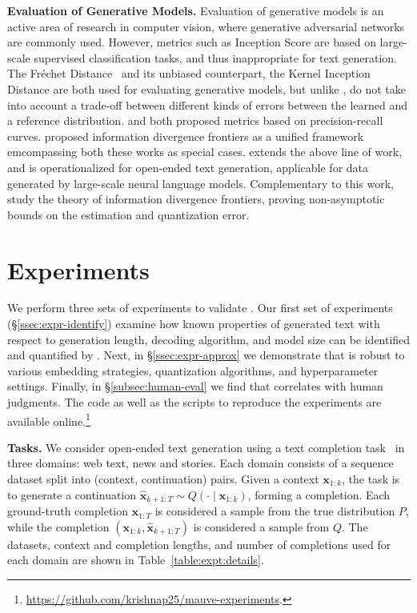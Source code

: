 \documentclass{article}
\newcommand{\myparagraph}[1]{\par\noindent\textbf{{#1}.}} %
\newcommand \xv {\bm{x}}
\theoremstyle{definition}
\newcommand{\name}{{\fontfamily{bch}\selectfont{\textsc{Mauve}}}\xspace}
\begin{document}
\myparagraph{Evaluation of Generative Models}
Evaluation of generative models is an active area of research in computer vision, where generative adversarial networks \cite{goodfellow2014generative} are commonly used.
However, metrics such as Inception Score \cite{salimans2016improved} are based on large-scale supervised classification tasks, and thus inappropriate for text generation.
%
The Fr\'{e}chet Distance~\cite{heusel2017gans,semeniuta2018accurate} and its unbiased counterpart, the Kernel Inception Distance \cite{bikowski2018demystifying} are both used for evaluating generative models, but unlike \name, do not take into account a trade-off between different kinds of errors between the learned and a reference distribution.
\citet{sajjadi2018assessing} and \citet{kynknniemi2019improved} both proposed metrics based on precision-recall curves.
\citet{djolonga2020precision} proposed information divergence frontiers as a unified framework emcompassing both these works as special cases. 
\name extends the above line of work, and is operationalized for open-ended text generation, applicable for data generated by large-scale neural language models. 
Complementary to this work, \citet{liu2021divergence} study the theory of information divergence frontiers, proving non-asymptotic bounds on the estimation and quantization error.


%


%
%
\section{Experiments}
\label{sec:experiments}
%


We perform three sets of experiments to validate \name.
%
Our first set of experiments (\S\ref{ssec:expr-identify}) examine how known properties of generated text with respect to generation length, decoding algorithm,  and model size can be identified and quantified by \name.
Next, in \S\ref{ssec:expr-approx} we demonstrate that \name is robust to various embedding strategies, quantization algorithms, and hyperparameter settings.
Finally, in \S\ref{subsec:human-eval} we find that \name correlates with human judgments.
The code as well as the scripts to reproduce the experiments are available online.\footnote{
        \url{https://github.com/krishnap25/mauve-experiments}.
}
%
%
%
%
%


\myparagraph{Tasks}
We consider open-ended text generation using a text completion task~\citep{holtzman2019curious,welleck2020neural} in three domains: web text, news and stories.
Each domain consists of a sequence dataset split into (context, continuation) pairs.
Given a context $\xv_{1:k}$, the task is to generate a continuation $\hat{\xv}_{k+1:T}\sim Q(\cdot\mid\xv_{1:k})$, forming a completion.
Each ground-truth completion $\xv_{1:T}$ is considered a sample from the true distribution $P$, while the completion $(\xv_{1:k},\hat{\xv}_{k+1:T})$ is considered a sample from $Q$.
The datasets, context and completion lengths, and number of completions used for each domain are shown in Table~\ref{table:expt:details}.
\end{document}
